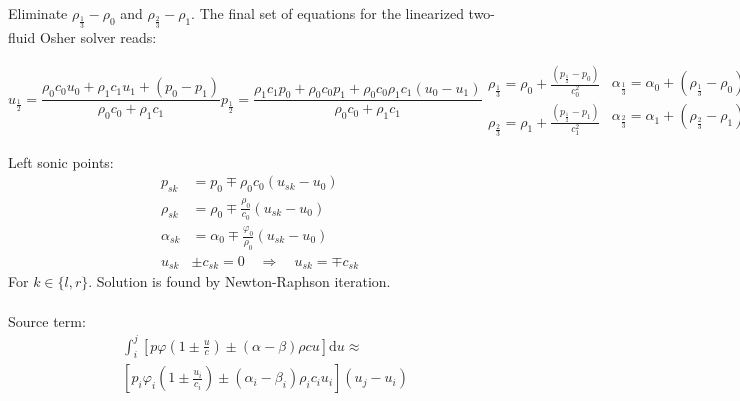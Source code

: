 \documentclass{article}
\newcommand{\ud}{\mathrm{d}}
\begin{document}
Eliminate $\rho_{\frac{1}{3}}-\rho_0$ and $\rho_{\frac{2}{3}}-\rho_1$. The final set of equations for the linearized two-fluid Osher solver reads:

\begin{subequations}
\begin{equation}
u_{\frac{1}{2}}=\frac{\rho_0c_0u_0+\rho_1c_1u_1+(p_0-p_1)}{\rho_0c_0+\rho_1c_1}
\end{equation}

\begin{equation}
p_{\frac{1}{2}}=\frac{\rho_1c_1p_0+\rho_0c_0p_1+\rho_0c_0\rho_1c_1(u_0-u_1)}{\rho_0c_0+\rho_1c_1}
\end{equation}

\begin{equation}
\begin{aligned}
\rho_{\frac{1}{3}}=\rho_0+\frac{(p_{\frac{1}{2}}-p_0)}{c_0^2}\\
\rho_{\frac{2}{3}}=\rho_1+\frac{(p_{\frac{1}{2}}-p_1)}{c_1^2}
\end{aligned}
\end{equation}

\begin{equation}
\begin{aligned}
\alpha_{\frac{1}{3}}=\alpha_0+(\rho_{\frac{1}{3}}-\rho_0)\frac{\varphi_0}{\rho_0}\\
\alpha_{\frac{2}{3}}=\alpha_1+(\rho_{\frac{2}{3}}-\rho_1)\frac{\varphi_1}{\rho_1}
\end{aligned}
\end{equation}

\begin{equation}
\begin{aligned}
\beta_{\frac{1}{3}}=\beta_0\\
\beta_{\frac{2}{3}}=\beta_1
\end{aligned}
\end{equation}
\end{subequations}

Left sonic points:
\begin{align*}
p_{sk}&=p_0\mp\rho_0c_0(u_{sk}-u_0)\\
\rho_{sk}&=\rho_0\mp\frac{\rho_0}{c_0}(u_{sk}-u_0)\\
\alpha_{sk}&=\alpha_0\mp\frac{\varphi_0}{\rho_0}(u_{sk}-u_0)\\
u_{sk}&\pm c_{sk}=0 \quad \Rightarrow \quad u_{sk}=\mp c_{sk}
\end{align*}
For $k\in\{l,r\}$. Solution is found by Newton-Raphson iteration.\\
 \\
Source term:
\begin{align*}
&\int_i^j\left[p\varphi\left(1\pm\frac{u}{c}\right)\pm\left(\alpha-\beta\right)\rho c u\right]\ud u\approx\\
&\left[p_i\varphi_i\left(1\pm\frac{u_i}{c_i}\right)\pm\left(\alpha_i-\beta_i\right)\rho_i c_i u_i\right](u_j-u_i)
\end{align*}
\end{document}
